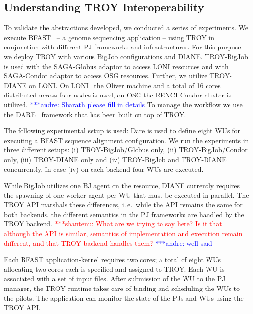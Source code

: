 \documentclass[conference,final]{IEEEtran}
\newcommand{\jhanote}[1]{ {\textcolor{red} { ***shantenu: #1 }}}
\newcommand{\alnote}[1]{ {\textcolor{blue} { ***andre: #1 }}}
\newcommand{\smnote}[1]{ {\textcolor{green} { ***sharath: #1 }}}
\newcommand{\alnote}[1]{}
\newcommand{\smnote}[1]{}
\newcommand{\jhanote}[1]{}
\begin{document}
\subsection{Understanding TROY Interoperability}

To validate the abstractions developed, we conducted a series of experiments. We
execute BFAST~\cite{bfast2009} -- a genome sequencing application -- using TROY
in conjunction with different PJ frameworks and infrastructures. For this 
purpose we deploy TROY with various BigJob configurations and DIANE.
TROY-BigJob is used with the SAGA-Globus adaptor to access LONI resources and 
with SAGA-Condor adaptor to access OSG resources. Further, we utilize TROY-DIANE 
on LONI. On LONI~\cite{loni} the Oliver machine and a total of 16 cores 
distributed across four nodes is used, on OSG the RENCI Condor cluster is  
utilized. \alnote{Sharath please fill in details} To manage the workflow we use the DARE~\cite{dare-tg11-gateways} framework that has been built on top of TROY.

The following experimental setup is used:  Dare is used to define eight WUs for 
executing a BFAST sequence alignment configuration. We run the experiments in 
three different setups: (i) TROY-BigJob/Globus only, (ii) TROY-BigJob/Condor 
only, (iii) TROY-DIANE only and (iv)  TROY-BigJob and TROY-DIANE concurrently. 
In case (iv) on each backend four WUs are executed.


While BigJob utilizes one BJ agent on the resource, DIANE currently requires the
spawning of one worker agent per WU that must be executed in parallel. The TROY
API marshals these differences, i.\,e.\ while the API remains the same for both
backends, the different semantics in the PJ frameworks are handled by the TROY
backend.
\jhanote{What are we trying to say here?  Is it that although the API
  is similar, semantics of implementation and execution remain
  different, and that TROY backend handles them?}\alnote{well said}

Each BFAST application-kernel requires two cores; a total of eight WUs
allocating two cores each is specified and assigned to TROY. Each WU
is associated with a set of input files. After submission of the WU to
the PJ manager, the TROY runtime takes care of binding and scheduling
the WUs to the pilots. The application can monitor the state of the
PJs and WUs using the TROY API.


\end{document}
